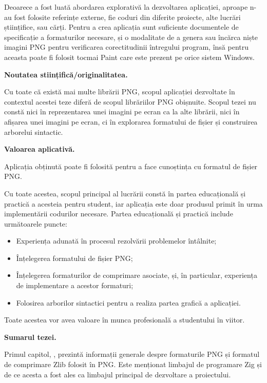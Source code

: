 \documentclass[a4paper,12pt]{report}
\begin{document}
Deoarece a fost luată abordarea explorativă la dezvoltarea aplicației,
aproape n-au fost folosite referințe externe,
fie coduri din diferite proiecte, alte lucrări științifice, sau cărți.
Pentru a crea aplicația sunt suficiente documentele de specificație a formaturilor necesare,
și o modalitate de a genera sau încărca niște imagini \ac{PNG}
pentru verificarea corectitudinii întregului program,
însă pentru aceasta poate fi folosit tocmai Paint care este prezent pe orice sistem Windows.

\textbf{Noutatea stiințifică/originalitatea.}

Cu toate că există mai multe librării \ac{PNG},
scopul aplicației dezvoltate în contextul acestei teze diferă de scopul librăriilor \ac{PNG} obișnuite.
Scopul tezei nu constă nici în reprezentarea unei imagini pe ecran ca la alte librării,
nici în afișarea unei imagini pe ecran,
ci în explorarea formatului de fișier și construirea arborelui sintactic.

\textbf{Valoarea aplicativă.}

Aplicația obținută poate fi folosită pentru a face cunoștința cu formatul de fișier \acs{PNG}.

Cu toate acestea, scopul principal al lucrării constă
în partea educațională și practică a acesteia pentru student,
iar aplicația este doar produsul primit în urma implementării codurilor necesare.
Partea educațională și practică include următoarele puncte:
\begin{itemize}
    \item Experiența adunată în procesul rezolvării problemelor întâlnite;
    \item Înțelegerea formatului de fișier \acs{PNG};
    \item
        Înțelegerea formaturilor de comprimare asociate,
        și, în particular, experiența de implementare a acestor formaturi;
    \item Folosirea arborilor sintactici pentru a realiza partea grafică a aplicației.
\end{itemize}

Toate acestea vor avea valoare în munca profesională a studentului în viitor.


\textbf{Sumarul tezei.}

Primul capitol, , prezintă informații generale despre
formaturile \acs{PNG} și formatul de comprimare Zlib folosit în \acs{PNG}.
Este menționat limbajul de programare Zig și de ce acesta a fost ales
ca limbajul principal de dezvoltare a proiectului.
\end{document}
